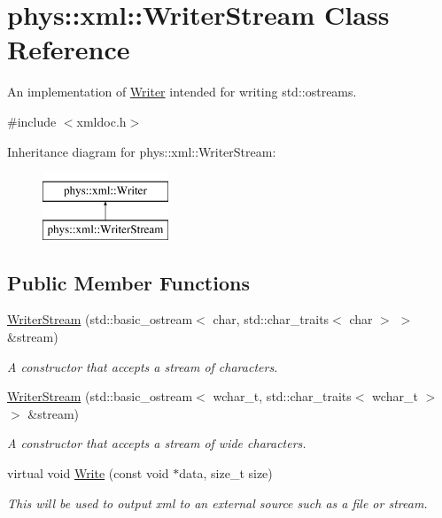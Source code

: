 \hypertarget{classphys_1_1xml_1_1WriterStream}{
\section{phys::xml::WriterStream Class Reference}
\label{d5/d6f/classphys_1_1xml_1_1WriterStream}
}


An implementation of \hyperlink{classphys_1_1xml_1_1Writer}{Writer} intended for writing std::ostreams.  




{\ttfamily \#include $<$xmldoc.h$>$}

Inheritance diagram for phys::xml::WriterStream:\begin{figure}[H]
\begin{center}
\leavevmode
\includegraphics[height=2.000000cm]{d5/d6f/classphys_1_1xml_1_1WriterStream}
\end{center}
\end{figure}
\subsection*{Public Member Functions}
\begin{DoxyCompactItemize}
\item 
\hyperlink{classphys_1_1xml_1_1WriterStream_ae170ab7c429b6f7149d3540243329dfa}{WriterStream} (std::basic\_\-ostream$<$ char, std::char\_\-traits$<$ char $>$ $>$ \&stream)
\begin{DoxyCompactList}\small\item\em A constructor that accepts a stream of characters. \item\end{DoxyCompactList}\item 
\hyperlink{classphys_1_1xml_1_1WriterStream_aaebcd545af8e44cf6556a46077f0a366}{WriterStream} (std::basic\_\-ostream$<$ wchar\_\-t, std::char\_\-traits$<$ wchar\_\-t $>$ $>$ \&stream)
\begin{DoxyCompactList}\small\item\em A constructor that accepts a stream of wide characters. \item\end{DoxyCompactList}\item 
virtual void \hyperlink{classphys_1_1xml_1_1WriterStream_a743c3f41a010df17f54054031fdc4891}{Write} (const void $\ast$data, size\_\-t size)
\begin{DoxyCompactList}\small\item\em This will be used to output xml to an external source such as a file or stream. \item\end{DoxyCompactList}\end{DoxyCompactItemize}



